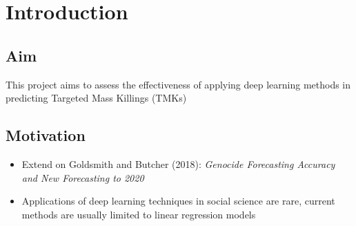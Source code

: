 \chapter{Introduction}\label{ch:intro}

\section{Aim}
This project aims to assess the effectiveness of applying deep learning methods in predicting Targeted Mass Killings (TMKs)

\section{Motivation}
\begin{itemize}
  \item Extend on Goldsmith and Butcher (2018): \emph{Genocide Forecasting Accuracy and New Forecasting to 2020}
  \item Applications of deep learning techniques in social science are rare, current methods are usually limited to linear regression models
\end{itemize}


